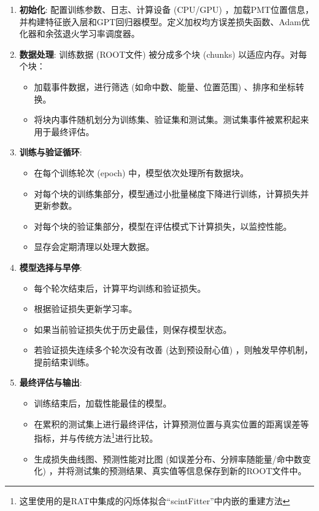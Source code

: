 \begin{enumerate}
    \item \textbf{初始化}: 配置训练参数、日志、计算设备 (CPU/GPU) ，加载PMT位置信息，并构建特征嵌入层和GPT回归器模型。定义加权均方误差损失函数、Adam优化器和余弦退火学习率调度器。
    \item \textbf{数据处理}: 训练数据 (ROOT文件) 被分成多个块 (chunks) 以适应内存。对每个块：
        \begin{itemize}
            \item 加载事件数据，进行筛选 (如命中数、能量、位置范围) 、排序和坐标转换。
            \item 将块内事件随机划分为训练集、验证集和测试集。测试集事件被累积起来用于最终评估。
        \end{itemize}
    \item \textbf{训练与验证循环}:
        \begin{itemize}
            \item 在每个训练轮次 (epoch) 中，模型依次处理所有数据块。
            \item 对每个块的训练集部分，模型通过小批量梯度下降进行训练，计算损失并更新参数。
            \item 对每个块的验证集部分，模型在评估模式下计算损失，以监控性能。
            \item 显存会定期清理以处理大数据。
        \end{itemize}
    \item \textbf{模型选择与早停}:
        \begin{itemize}
            \item 每个轮次结束后，计算平均训练和验证损失。
            \item 根据验证损失更新学习率。
            \item 如果当前验证损失优于历史最佳，则保存模型状态。
            \item 若验证损失连续多个轮次没有改善 (达到预设耐心值) ，则触发早停机制，提前结束训练。
        \end{itemize}
    \item \textbf{最终评估与输出}:
        \begin{itemize}
            \item 训练结束后，加载性能最佳的模型。
            \item 在累积的测试集上进行最终评估，计算预测位置与真实位置的距离误差等指标，并与传统方法\footnote{这里使用的是RAT中集成的闪烁体拟合“scintFitter”中内嵌的重建方法}进行比较。
            \item 生成损失曲线图、预测性能对比图 (如误差分布、分辨率随能量/命中数变化) ，并将测试集的预测结果、真实值等信息保存到新的ROOT文件中。
        \end{itemize}
\end{enumerate}

